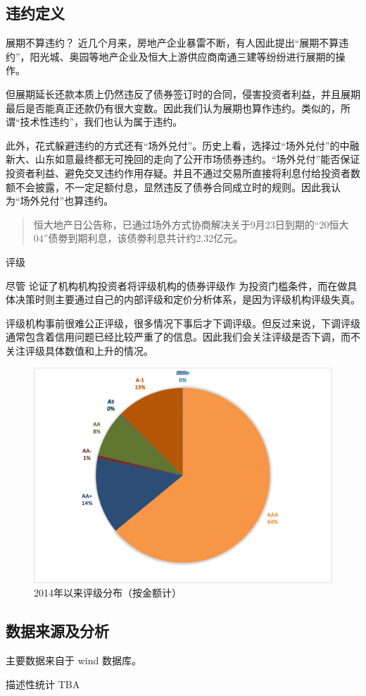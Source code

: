 \subsection{违约定义}
\begin{frame}{展期不算违约？}
	近几个月来，房地产企业暴雷不断，有人因此提出“展期不算违约”，阳光城、奥园等地产企业及恒大上游供应商南通三建等纷纷进行展期的操作。

	但展期延长还款本质上仍然违反了债券签订时的合同，侵害投资者利益，并且展期最后是否能真正还款仍有很大变数。因此我们认为展期也算作违约。类似的，所谓“技术性违约”，我们也认为属于违约。

	此外，花式躲避违约的方式还有“场外兑付”。历史上看，选择过“场外兑付”的中融新大、山东如意最终都无可挽回的走向了公开市场债券违约。“场外兑付”能否保证投资者利益、避免交叉违约作用存疑。并且不通过交易所直接将利息付给投资者数额不会披露，不一定足额付息，显然违反了债券合同成立时的规则。因此我认为“场外兑付”也算违约。
	\begin{quote}
		恒大地产日公告称，已通过场外方式协商解决关于9月23日到期的“20恒大04”债劵到期利息，该债劵利息共计约2.32亿元。
	\end{quote}
\end{frame}
\begin{frame}{评级}
	\small{\small {尽管\citet{梅冬州2021财政扩张} 论证了机构机构投资者将评级机构的债券评级作 为投资门槛条件，而在做具体决策时则主要通过自己的内部评级和定价分析体系，是因为评级机构评级失真。

			评级机构事前很难公正评级，很多情况下事后才下调评级。但反过来说，下调评级通常包含着信用问题已经比较严重了的信息。因此我们会关注评级是否下调，而不关注评级具体数值和上升的情况。}}
	\begin{figure}
		\centering
		\includegraphics[width=0.6\linewidth]{lib/rating.png}
		\caption{2014年以来评级分布（按金额计）}
	\end{figure}
\end{frame}
\subsection{数据来源及分析}
\begin{frame}
	主要数据来自于 wind 数据库。

	描述性统计 TBA
\end{frame}
